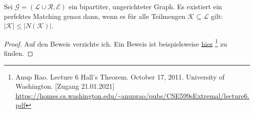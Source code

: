 \begin{satz}
Sei $\mathcal{G} = (\mathcal{L} \cup \mathcal{R}, \mathcal{E})$ ein bipartiter, ungerichteter Graph.
Es existiert ein perfektes Matching genau dann,
wenn es für alle Teilmengen $\mathcal{K} \subseteq \mathcal{L}$ gilt: $|\mathcal{K}| \leqslant |N(\mathcal{K})|$.
\end{satz}

\begin{proof}
Auf den Beweis verzichte ich. Ein Beweis ist beispielsweise
\href{https://homes.cs.washington.edu/~anuprao/pubs/CSE599sExtremal/lecture6.pdf}{hier}
\footnote{Anup Rao. Lecture 6 Hall’s Theorem. October 17, 2011. University of Washington. [Zugang 21.01.2021]\\
\url{https://homes.cs.washington.edu/~anuprao/pubs/CSE599sExtremal/lecture6.pdf}} zu finden.
\end{proof}
